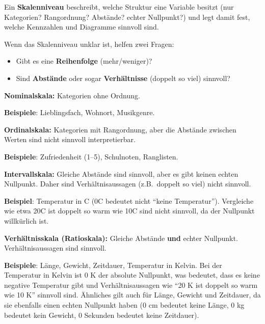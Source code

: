 \begin{mydefinition}\label{mydefinition:skalenniveau}
	Ein \textbf{Skalenniveau} beschreibt, welche Struktur eine Variable besitzt (nur Kategorien? Rangordnung? Abstände? echter Nullpunkt?)
	und legt damit fest, welche Kennzahlen und Diagramme sinnvoll sind.
\end{mydefinition}

\begin{myremark}
	Wenn das Skalenniveau unklar ist, helfen zwei Fragen:
	\begin{itemize}
		\item Gibt es eine \textbf{Reihenfolge} (mehr/weniger)?
		\item Sind \textbf{Abstände} oder sogar \textbf{Verhältnisse} (doppelt so viel) sinnvoll?
	\end{itemize}
\end{myremark}

\begin{mydefinition}\label{mydefinition:nominalskala}
	\textbf{Nominalskala:} Kategorien ohne Ordnung.

	\textbf{Beispiele}: Lieblingsfach, Wohnort, Musikgenre.
\end{mydefinition}

\begin{mydefinition}\label{mydefinition:ordinalskala}
	\textbf{Ordinalskala:} Kategorien mit Rangordnung, aber die Abstände zwischen Werten sind nicht sinnvoll interpretierbar.

	\textbf{Beispiele}: Zufriedenheit (1--5), Schulnoten, Ranglisten.
\end{mydefinition}

\begin{mydefinition}\label{mydefinition:intervallskala}
	\textbf{Intervallskala:} Gleiche Abstände sind sinnvoll, aber es gibt keinen echten Nullpunkt. Daher sind Verhältnisaussagen (z.B.\ doppelt so viel) nicht sinnvoll.

	\textbf{Beispiel}: Temperatur in \textdegree C (0\textdegree C bedeutet nicht ``keine Temperatur''). Vergleiche wie etwa 20\textdegree C ist doppelt so warm wie 10\textdegree C sind nicht sinnvoll, da der Nullpunkt willkürlich ist.
\end{mydefinition}

\begin{mydefinition}\label{mydefinition:verhältnisskala}
	\textbf{Verhältnisskala (Ratioskala):} Gleiche Abstände \textbf{und} echter Nullpunkt. Verhältnisaussagen sind sinnvoll.

	\textbf{Beispiele}: Länge, Gewicht, Zeitdauer, Temperatur in Kelvin. Bei der Temperatur in Kelvin ist 0 K der absolute Nullpunkt, was bedeutet, dass es keine negative Temperatur gibt und Verhältnisaussagen wie ``20 K ist doppelt so warm wie 10 K'' sinnvoll sind. Ähnliches gilt auch für Länge, Gewicht und Zeitdauer, da sie ebenfalls einen echten Nullpunkt haben (0 cm bedeutet keine Länge, 0 kg bedeutet kein Gewicht, 0 Sekunden bedeutet keine Zeitdauer).
\end{mydefinition}

